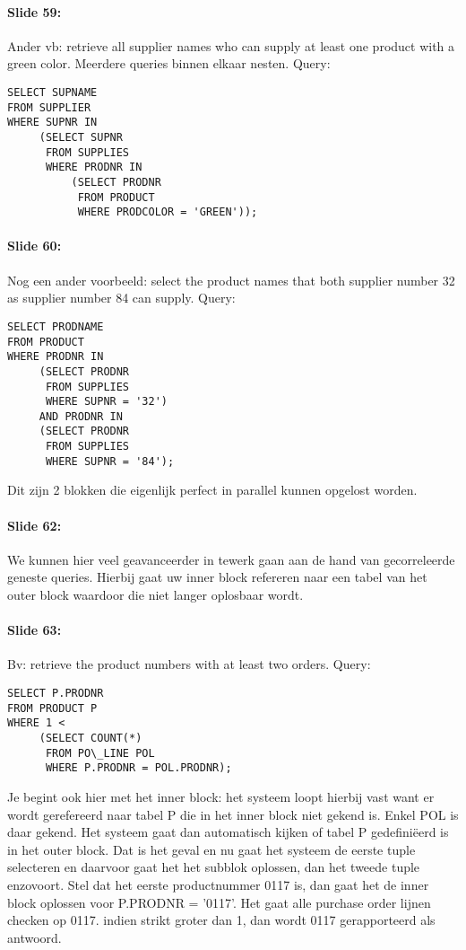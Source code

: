 \documentclass[10pt,a4paper]{report}
\begin{document}
\paragraph{Slide 59:}Ander vb: retrieve all supplier names who can supply at least one product with a  green color. Meerdere queries binnen elkaar nesten. Query:
\begin{verbatim}
SELECT SUPNAME
FROM SUPPLIER
WHERE SUPNR IN
     (SELECT SUPNR
      FROM SUPPLIES
      WHERE PRODNR IN
          (SELECT PRODNR
           FROM PRODUCT
           WHERE PRODCOLOR = 'GREEN'));
\end{verbatim}

\paragraph{Slide 60:}Nog een ander voorbeeld: select the product names that both supplier number 32 as supplier number 84 can supply. Query:
\begin{verbatim}
SELECT PRODNAME
FROM PRODUCT
WHERE PRODNR IN
     (SELECT PRODNR
      FROM SUPPLIES
      WHERE SUPNR = '32')
     AND PRODNR IN
     (SELECT PRODNR
      FROM SUPPLIES
      WHERE SUPNR = '84');
\end{verbatim}
Dit zijn 2 blokken die eigenlijk perfect in parallel kunnen opgelost worden.

\paragraph{Slide 62:}We kunnen hier veel geavanceerder in tewerk gaan aan de hand van gecorreleerde geneste queries. Hierbij gaat uw inner block refereren naar een tabel van het outer block waardoor die niet langer oplosbaar wordt.

\paragraph{Slide 63:}Bv: retrieve the product numbers with at least two orders. Query:
\begin{verbatim}
SELECT P.PRODNR
FROM PRODUCT P
WHERE 1 <
     (SELECT COUNT(*)
      FROM PO\_LINE POL
      WHERE P.PRODNR = POL.PRODNR);
\end{verbatim}
Je begint ook hier met het inner block: het systeem loopt hierbij vast want er wordt gerefereerd naar tabel P die in het inner block niet gekend is. Enkel POL is daar gekend. Het systeem gaat dan automatisch kijken of tabel P gedefiniëerd is in het outer block. Dat is het geval en nu gaat het systeem de eerste tuple selecteren en daarvoor gaat het het subblok oplossen, dan het tweede tuple enzovoort.
Stel dat het eerste productnummer 0117 is, dan gaat het de inner block oplossen voor P.PRODNR = '0117'. Het gaat alle purchase order lijnen checken op 0117. indien strikt groter dan 1, dan wordt 0117 gerapporteerd als antwoord.
\end{document}
